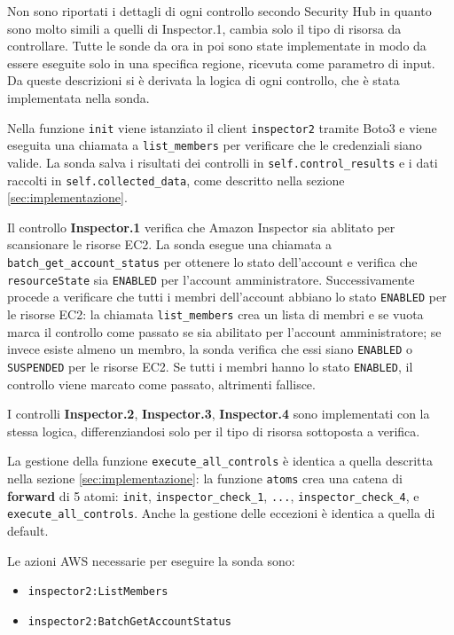 Non sono riportati i dettagli di ogni controllo secondo Security Hub in quanto sono molto simili a quelli di Inspector.1, cambia solo il tipo di risorsa da controllare. Tutte le sonde da ora in poi sono state implementate in modo da essere eseguite solo in una specifica regione, ricevuta come parametro di input. Da queste descrizioni si è derivata la logica di ogni controllo, che è stata implementata nella sonda.


Nella funzione \texttt{init} viene istanziato il client \texttt{inspector2} tramite Boto3 e viene eseguita una chiamata a \texttt{list\_members} per verificare che le credenziali siano valide. La sonda salva i risultati dei controlli in \texttt{self.control\_results} e i dati raccolti in \texttt{self.collected\_data}, come descritto nella sezione \ref{sec:implementazione}. 

Il controllo \textbf{Inspector.1} verifica che Amazon Inspector sia ablitato per scansionare le risorse EC2. La sonda esegue una chiamata a \texttt{batch\_get\_account\_status} per ottenere lo stato dell'account e verifica che \texttt{resourceState} sia \texttt{ENABLED} per l'account amministratore. Successivamente procede a verificare che tutti i membri dell'account abbiano lo stato \texttt{ENABLED} per le risorse EC2: la chiamata \texttt{list\_members} crea un lista di membri e se vuota marca il controllo come passato se sia abilitato per l'account amministratore; se invece esiste almeno un membro, la sonda verifica che essi siano \texttt{ENABLED} o \texttt{SUSPENDED} per le risorse EC2. Se tutti i membri hanno lo stato \texttt{ENABLED}, il controllo viene marcato come passato, altrimenti fallisce.

I controlli \textbf{Inspector.2}, \textbf{Inspector.3}, \textbf{Inspector.4} sono implementati con la stessa logica, differenziandosi solo per il tipo di risorsa sottoposta a verifica.

La gestione della funzione \texttt{execute\_all\_controls} è identica a quella descritta nella sezione \ref{sec:implementazione}: la funzione \texttt{atoms} crea una catena di \textbf{forward} di 5 atomi: \texttt{init}, \texttt{inspector\_check\_1}, \texttt{...}, \texttt{inspector\_check\_4}, e \texttt{execute\_all\_controls}. Anche la gestione delle eccezioni è identica a quella di default. 

Le azioni AWS necessarie per eseguire la sonda sono:

\begin{itemize}
    \item \texttt{inspector2:ListMembers}
    \item \texttt{inspector2:BatchGetAccountStatus}
\end{itemize}

